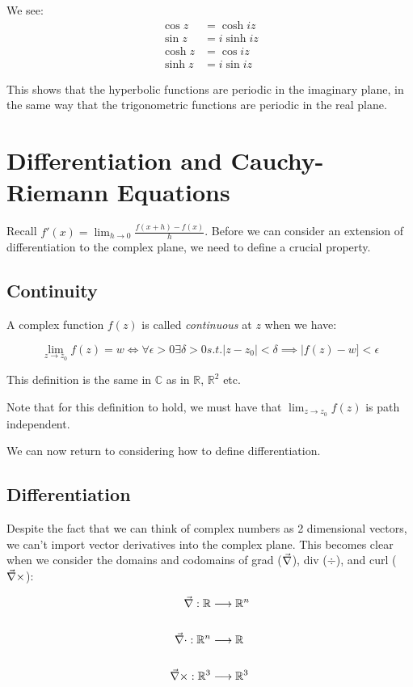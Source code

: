 \documentclass{physics_notes}
\begin{document}
We see:
\begin{align}
\cos{z} &= \cosh{iz} \\
\sin{z} &= i\sinh{iz} \\
\cosh{z} &= \cos{iz} \\
\sinh{z} &= i\sin{iz}
\end{align}

This shows that the hyperbolic functions are periodic in the imaginary plane, in the same way that the trigonometric functions are periodic in the real plane. 

\section{Differentiation and Cauchy-Riemann Equations}
Recall $f'(x) = \lim_{h\to 0} \frac{f(x + h) - f(x)}{h}$. Before we can consider an extension of differentiation to the complex plane, we need to define a crucial property.

\subsection{Continuity}

A complex function $f(z)$ is called \emph{continuous} at $z$ when we have:

\[ \lim_{z\to z_0} f(z) = w \iff \forall \epsilon > 0 \exists \delta > 0 s.t. |z - z_0| < \delta \implies |f(z) - w] < \epsilon \]

This definition is the same in $\mathbb{C}$ as in $\mathbb{R}$, $\mathbb{R}^2$ etc. 

Note that for this definition to hold, we must have that $\lim_{z\to z_0} f(z)$ is path independent. 

We can now return to considering how to define differentiation.

\subsection{Differentiation }

Despite the fact that we can think of complex numbers as 2 dimensional vectors, we can't import vector derivatives into the complex plane. This becomes clear when we consider the domains and codomains of grad ($\vec{\nabla}$), div ($\div$), and curl ($\vec{\nabla} \times$):

\begin{align*}
\vec{\nabla}: \mathbb{R} &\longrightarrow \mathbb{R}^n \\
&\\
\vec{\nabla} \cdot: \mathbb{R}^n &\longrightarrow \mathbb{R} \\
&\\
\vec{\nabla} \times: \mathbb{R}^3 &\longrightarrow \mathbb{R}^3 
\end{align*}
\end{document}
